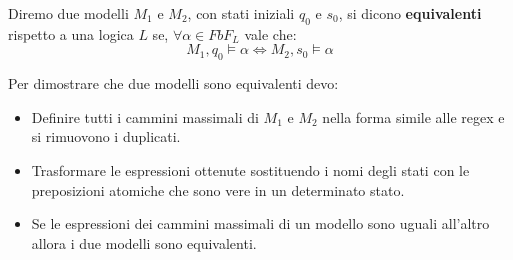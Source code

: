 \begin{definizione}
    Diremo due modelli $M_1$ e $M_2$, con stati iniziali $q_0$ e $s_0$, si dicono
    \textbf{equivalenti} rispetto a una logica $L$ se, $\forall \alpha \in FbF_L$
    vale che:
    \begin{equation}
        M_1, q_0 \models \alpha \iff M_2, s_0 \models \alpha
    \end{equation}
\end{definizione}
Per dimostrare che due modelli sono equivalenti devo:
\begin{itemize}
    \item Definire tutti i cammini massimali di $M_1$ e $M_2$ nella forma simile
          alle regex e si rimuovono i duplicati.
    \item Trasformare le espressioni ottenute sostituendo i nomi degli stati con
          le preposizioni atomiche che sono vere in un determinato stato.
    \item Se le espressioni dei cammini massimali di un modello sono uguali
          all'altro allora i due modelli sono equivalenti.
\end{itemize}
